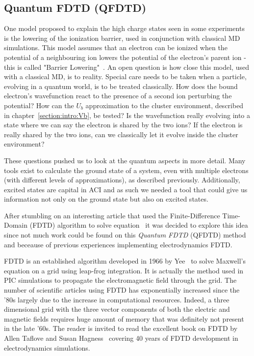 \subsection{Quantum FDTD (QFDTD)}
\label{section:tools:qfdtd}


One model proposed to explain the high charge states seen in some experiments
is the lowering of the ionization barrier, used in conjunction with classical
MD simulations. This model assumes that an electron can be ionized when
the potential of a neighbouring ion lowers the potential of the electron's
parent ion - this is called "Barrier Lowering"~\cite{Georgescu2007,Fennel2010}.
An open question is how close this model, used
with a classical MD, is to reality. Special care needs to be taken when a
particle, evolving in a quantum world, is to be treated classically.
How does
the bound electron's wavefunction react to the presence of a second ion
perturbing the potential? How can the $U_b$ approximation to the cluster
environment, described in chapter~\ref{section:intro:Vb}, be tested?
Is the wavefunction really evolving into a state
where we can say the electron is shared by the two ions? If the electron is
really shared by the two ions, can we classically let it evolve inside the
cluster environment?

These questions pushed us to look at the quantum aspects in more detail. Many
tools exist to calculate the ground state of a system, even with
multiple electrons (with different levels of approximations),
as described previously. Additionally, excited states are
capital in ACI and as such we needed a tool that could give us information not
only on the ground state but also on excited states.

After stumbling on an interesting article that used the Finite-Difference
Time-Domain (FDTD) algorithm to solve \schrodinger equation~\cite{Sudiarta2007}
it was decided to explore this idea since not much work could be found on this
\textit{Quantum FDTD} (QFDTD) method and beceause of previous experiences
implementing electrodynamics FDTD.

FDTD is an established algorithm developed in 1966 by Yee~\cite{Yee1966} to solve
Maxwell's equation on a grid using leap-frog integration.
It is actually the method used in PIC simulations to propagate the electromagnetic
field through the grid.
The number of
scientific articles using FDTD has exponentially increased since the '80s
largely due to the increase in computational resources. Indeed, a three
dimensional grid with the three vector components of both the electric and
magnetic fields requires huge amount of memory that was definitely not present
in the late '60s. The reader is invited to read the excellent book on FDTD by
Allen Taflove and Susan Hagness~\cite{Taflove2005} covering 40 years of FDTD
development in electrodynamics simulations.

